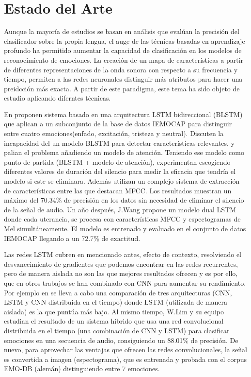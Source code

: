 \documentclass[11pt,a4paper,spanish]{book}
\begin{document}
	

	
	\section{Estado del Arte}
	\label{lb_estado_arte}
	Aunque la mayoría de estudios se basan en análisis que evalúan la precisión del clasificador sobre la propia lengua, el auge de las técnicas basadas en aprendizaje profundo ha permitido aumentar la capacidad de clasificación en los modelos de reconocimiento de emociones. La creación de un mapa de características a partir de diferentes representaciones de la onda sonora con respecto a su frecuencia y tiempo, permiten a las redes neuronales distinguir más atributos para hacer una preidcción más exacta. A partir de este paradigma, este tema ha sido objeto de estudio aplicando diferntes técnicas.

	En \cite{Atmaja2019} proponen sistema basado en una arquitectura LSTM bidireccional (BLSTM) que aplican a un subconjunto de la base de datos IEMOCAP para distinguir entre cuatro emociones(enfado, excitación, tristeza y neutral). Discuten la incapacidad del un modelo BLSTM para detectar características relevantes, y palian el problema añadiendo un modelo de atención. Teniendo ese modelo como punto de partida (BLSTM + modelo de atención), experimentan escogiendo diferentes valores de duración del silencio para medir la eficacia que tendría el modelo si este se eliminara. Además utilizan un complejo sistema de extracción de características entre las que destacan MFCC. Los resultados muestran un máximo del 70.34\% de precisión en los datos sin necesidad de eliminar el silencio de la señal de audio.
	Un año después, J.Wang \cite{Wang2020} propone un modelo dual LSTM donde cada uterancia, se procesa con características MFCC y espectogramas de Mel simultáneamente. El modelo es entrenado y evaluado en el conjunto de datos IEMOCAP llegando a un 72.7\% de exactitud.
		
	Las redes LSTM cubren en mencionado antes, efecto de contexto, resolviendo el desvanecimiento de gradientes que podemos encontrar en las redes recurrentes, pero de manera aislada no son las que mejores resultados ofrecen y es por ello, que en otros trabajos se han combinado con CNN para aumentar su rendimiento. Por ejemplo en \cite{Lim2017} se lleva a cabo una comparación de tres  arquitecturas (CNN, LSTM y CNN distribuida en el tiempo) donde LSTM (utilizada de manera aislada) es la que puntúa más bajo. Al mismo tiempo, W.Lim y su equipo estudian el resultado de un sistema híbrido que usa una red convolucional distribuida en el tiempo (una combinación de CNN y LSTM) para clasificar emociones en una secuencia de audio, consiguiendo un 88.01\% de precisión. De nuevo, para aprovechar las ventajas que ofrecen las redes convolucionales, la señal es convertida a imagen (espectograma), que es entrenada y probada con el corpus EMO-DB (alemán) distinguiendo entre 7 emociones.
	
\end{document}
